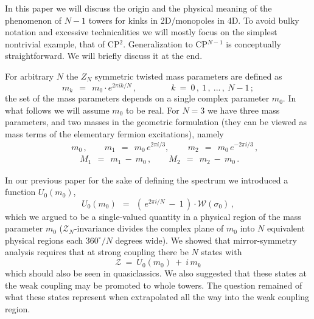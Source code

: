 \documentclass[epsfig,12pt]{article}
\def\beq{\begin{equation}}
\def\eeq{\end{equation}}
\def\beq{\begin{equation}}
\def\eeq{\end{equation}}
\newcommand{\mc}[1]{\mathcal{#1}}
\begin{document}
	In this paper we will discuss the origin and the physical meaning of the phenomenon of $N-1$ towers for 
	kinks in 2D/monopoles in 4D. To avoid bulky notation and excessive 
	technicalities we will mostly focus on the simplest nontrivial example,
	that of CP$^2$. Generalization to CP$^{N-1}$ is conceptually straightforward. We will briefly discuss it at the end.
	
	For arbitrary $N$ the $Z_N$ symmetric twisted mass parameters are defined as
	\beq
\label{mcirc}
	m_k ~~=~~ m_0 \cdot e^{2 \pi i k / N}\,,\qquad\qquad k~=~0\,,~1\,,~ ...\,,~ N-1\,;
\eeq
	the set of the mass parameters depends on  a single complex parameter $ m_0 $.
	In what follows we will assume $m_0$ to be real. For $N=3$ we have three mass parameters, 
	and two masses in the geometric formulation (they can be viewed as mass terms of the 
	elementary fermion excitations), namely
\begin{eqnarray}
	&& 
	m_0\,,\qquad  m_1 ~~=~~ m_0\, e^{2 \pi i  / 3},\,\qquad m_2 ~~=~~ m_0\, e^{-2 \pi i  / 3}\,,
	\nonumber\\[2mm]
	&&
	\quad M_1 ~~=~~ m_1 ~-~ m_0\, , \qquad M_2 ~~=~~ m_2 ~-~ m_0 \,.
\end{eqnarray}

	In our previous paper \cite{Bolokhov:2011mp} for the sake of defining the spectrum we introduced a function $ U_0(m_0) $,
\beq
	U_0 (m_0) ~~=~~ \left(\, e^{2 \pi i / N} ~-~ 1 \,\right) \cdot \mc{W}(\sigma_0)\,,
\eeq
	which we argued to be a single-valued quantity in a physical region of the mass parameter $ m_0 $
	($\mc{Z}_N$-invariance divides the complex plane of $ m_0 $ into $ N $ equivalent physical regions
	each $ 360^\circ/N $ degrees wide).
	We showed that mirror-symmetry analysis requires that at strong coupling there be $ N $ states
	with 
\beq
\label{Usp}
	\mc{Z} ~=~ U_0(m_0) ~+~ i\,m_k
\eeq
	which should also be seen in quasiclassics.
	We also suggested that these states at the weak coupling may be promoted to whole towers.
	The question remained of what these states represent when extrapolated all the way into the
	weak coupling region. 
\end{document}
